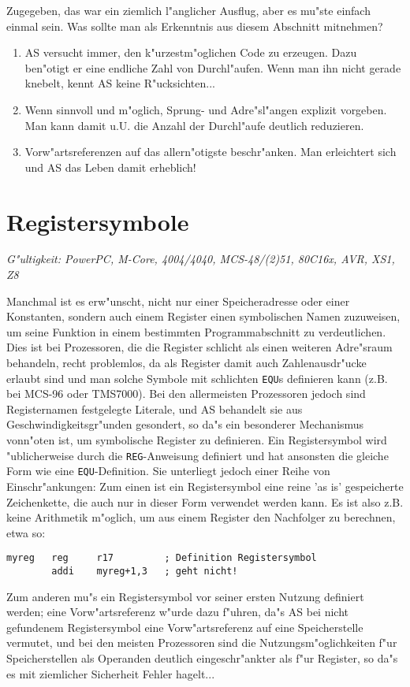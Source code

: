 \documentclass[12pt,a4paper,twoside]{report}
\makeatletter
\newcommand{\tty}[1]{{\tt #1}}
\newcommand{\ttindex}[1]{\index{#1@{\tt #1}}}
\makeatother
\begin{document}
Zugegeben, das war ein ziemlich l"anglicher Ausflug, aber es mu"ste einfach
einmal sein.  Was sollte man als Erkenntnis aus diesem Abschnitt mitnehmen?
\begin{enumerate}
\item{AS versucht immer, den k"urzestm"oglichen Code zu erzeugen.  Dazu
      ben"otigt er eine endliche Zahl von Durchl"aufen.  Wenn man ihn
      nicht gerade knebelt, kennt AS keine R"ucksichten...}
\item{Wenn sinnvoll und m"oglich, Sprung- und Adre"sl"angen explizit
      vorgeben.  Man kann damit u.U. die Anzahl der Durchl"aufe deutlich
      reduzieren.}
\item{Vorw"artsreferenzen auf das allern"otigste beschr"anken.  Man
      erleichtert sich und AS das Leben damit erheblich!}
\end{enumerate}


\section{Registersymbole}
\label{SectRegSyms} \ttindex{Registersymbole}

{\em G"ultigkeit: PowerPC, M-Core, 4004/4040, MCS-48/(2)51, 80C16x, AVR, XS1, Z8}

Manchmal ist es erw"unscht, nicht nur einer Speicheradresse oder einer
Konstanten, sondern auch einem Register einen symbolischen Namen zuzuweisen,
um seine Funktion in einem bestimmten Programmabschnitt zu verdeutlichen.
Dies ist bei Prozessoren, die die Register schlicht als einen weiteren
Adre"sraum behandeln, recht problemlos, da als Register damit auch
Zahlenausdr"ucke erlaubt sind und man solche Symbole mit schlichten
\tty{EQU}s definieren kann (z.B. bei MCS-96 oder TMS7000).  Bei den
allermeisten Prozessoren jedoch sind Registernamen festgelegte Literale, und
AS behandelt sie aus Geschwindigkeitsgr"unden gesondert, so da"s ein besonderer
Mechanismus vonn"oten ist, um symbolische Register zu definieren.  Ein Registersymbol
wird "ublicherweise durch die \tty{REG}-Anweisung definiert und hat ansonsten
die gleiche Form wie eine \tty{EQU}-Definition.  Sie unterliegt jedoch einer
Reihe von Einschr"ankungen:  Zum einen ist ein Registersymbol eine reine 'as is'
gespeicherte Zeichenkette, die auch nur in dieser Form verwendet werden kann.
Es ist also z.B. keine Arithmetik m"oglich, um aus einem Register den Nachfolger
zu berechnen, etwa so:
\begin{verbatim}
myreg   reg     r17         ; Definition Registersymbol
        addi    myreg+1,3   ; geht nicht!
\end{verbatim}
Zum anderen mu"s ein Registersymbol vor seiner ersten Nutzung definiert
werden; eine Vorw"artsreferenz w"urde dazu f"uhren, da"s AS bei nicht gefundenem
Registersymbol eine Vorw"artsreferenz auf eine Speicherstelle vermutet, und bei
den meisten Prozessoren sind die Nutzungsm"oglichkeiten f"ur Speicherstellen als
Operanden deutlich eingeschr"ankter als f"ur Register, so da"s es mit ziemlicher
Sicherheit Fehler hagelt...
\end{document}
